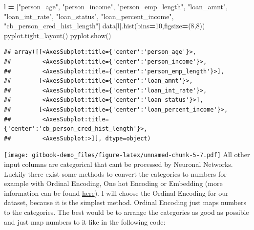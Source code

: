 \documentclass[
]{book}
\newenvironment{Shaded}{\begin{snugshade}}{\end{snugshade}}
\newcommand{\DecValTok}[1]{\textcolor[rgb]{0.00,0.00,0.81}{#1}}
\newcommand{\NormalTok}[1]{#1}
\newcommand{\OperatorTok}[1]{\textcolor[rgb]{0.81,0.36,0.00}{\textbf{#1}}}
\newcommand{\StringTok}[1]{\textcolor[rgb]{0.31,0.60,0.02}{#1}}
\begin{document}
\begin{Shaded}
\begin{Highlighting}[]
\NormalTok{l }\OperatorTok{=}\NormalTok{ [}\StringTok{"person\_age"}\NormalTok{, }\StringTok{"person\_income"}\NormalTok{, }\StringTok{"person\_emp\_length"}\NormalTok{, }\StringTok{"loan\_amnt"}\NormalTok{, }\StringTok{"loan\_int\_rate"}\NormalTok{, }\StringTok{"loan\_status"}\NormalTok{, }\StringTok{"loan\_percent\_income"}\NormalTok{, }\StringTok{"cb\_person\_cred\_hist\_length"}\NormalTok{]}
\NormalTok{data[l].hist(bins}\OperatorTok{=}\DecValTok{10}\NormalTok{,figsize}\OperatorTok{=}\NormalTok{(}\DecValTok{8}\NormalTok{,}\DecValTok{8}\NormalTok{))}
\NormalTok{pyplot.tight\_layout()}
\NormalTok{pyplot.show()}
\end{Highlighting}
\end{Shaded}

\begin{verbatim}
## array([[<AxesSubplot:title={'center':'person_age'}>,
##         <AxesSubplot:title={'center':'person_income'}>,
##         <AxesSubplot:title={'center':'person_emp_length'}>],
##        [<AxesSubplot:title={'center':'loan_amnt'}>,
##         <AxesSubplot:title={'center':'loan_int_rate'}>,
##         <AxesSubplot:title={'center':'loan_status'}>],
##        [<AxesSubplot:title={'center':'loan_percent_income'}>,
##         <AxesSubplot:title={'center':'cb_person_cred_hist_length'}>,
##         <AxesSubplot:>]], dtype=object)
\end{verbatim}

\texttt{[image: gitbook-demo\_files/figure-latex/unnamed-chunk-5-7.pdf]}
All other input columns are categorical that cant be processed by Neuronal Networks. Luckily there exist some methods to convert the categories to numbers for example with Ordinal Encoding, One hot Encoding or Embedding (more information can be found \href{https://machinelearningmastery.com/how-to-prepare-categorical-data-for-deep-learning-in-python/}{here}). I will choose the Ordinal Encoding for our dataset, because it is the simplest method. Ordinal Encoding just maps numbers to the categories. The best would be to arrange the categories as good as possible and just map numbers to it like in the following code:
\end{document}
